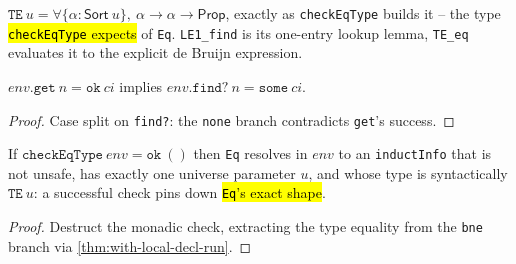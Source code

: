 \begin{definition}
\label{def:check-eq-type-shape}
\leanok
{}

 $\mathtt{TE}\ u = \forall \{\alpha : \mathsf{Sort}\ u\},\ \alpha \to
\alpha \to \mathsf{Prop}$, exactly as \texttt{checkEqType} builds it -- the type
\hl{\texttt{checkEqType} expects} of \texttt{Eq}. \texttt{LE1\_find} is its one-entry
lookup lemma, \texttt{TE\_eq} evaluates it to the explicit de Bruijn expression.
\end{definition}

\begin{lemma}
\label{thm:environment-get-ok}
\leanok
{}

 $env.\mathtt{get}\ n = \mathtt{ok}\ ci$ implies
$env.\mathtt{find?}\ n = \mathtt{some}\ ci$.
\end{lemma}
\begin{proof}
\leanok
{} Case split on \texttt{find?}: the \texttt{none} branch contradicts
\texttt{get}'s success.
\end{proof}

\begin{theorem}
\label{thm:check-eq-type-ok}
\leanok
{}

 If $\mathtt{checkEqType}\ env = \mathtt{ok}\ ()$ then \texttt{Eq} resolves
in $env$ to an \texttt{inductInfo} that is not unsafe, has exactly one universe parameter
$u$, and whose type is syntactically $\mathtt{TE}\ u$: a successful check pins down
\hl{\texttt{Eq}'s exact shape}.
\end{theorem}
\begin{proof}
\leanok
{} Destruct the monadic check, extracting the type equality from the
\texttt{bne} branch via \ref{thm:with-local-decl-run}.
\end{proof}

